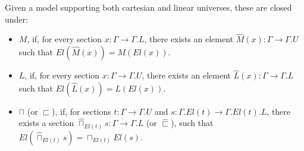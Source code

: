   \begin{defn}
    Given a model supporting both cartesian and linear universes, these are closed under:
    \begin{itemize}
    \item $M$, if, for every section $x : \Gamma \to \Gamma.L$, there exists an element $\hat M(x) : \Gamma \to \Gamma.U$ such that $El(\hat M(x)) = M(El(x))$.
    \item $L$, if, for every section $x : \Gamma \to \Gamma.U$, there exists an element $\hat L(x) : \Gamma \to \Gamma.L$ such that $El(\hat L(x)) = L(El(x))$.
    \item $\sqcap$ (or $\sqsubset$), if, for sections $t : \Gamma \to \Gamma.U$ and $s : \Gamma.El(t) \to \Gamma.El(t).L$, there exists a section $\hat \sqcap_{El(t)}s : \Gamma \to \Gamma.L$ (or $\hat \sqsubset$), such that $El(\hat \sqcap_{El(t)}s) = \sqcap_{El(t)}El(s)$.
    \end{itemize}
\end{defn}
